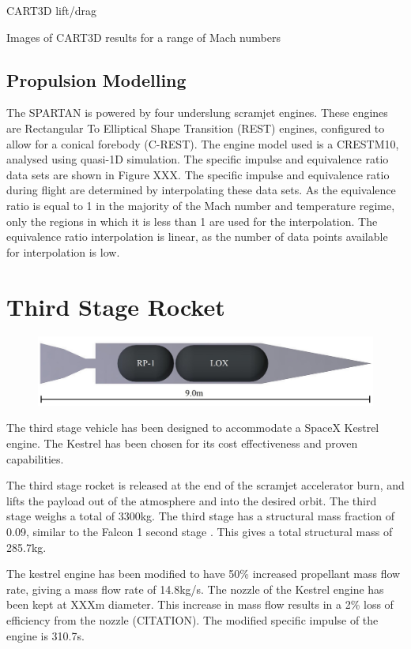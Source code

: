 CART3D lift/drag 

Images of CART3D results for a range of Mach numbers

		
		\subsection{Propulsion Modelling}
		
		The SPARTAN is powered by four underslung scramjet engines. These engines are Rectangular To Elliptical Shape Transition (REST) engines, configured to allow for a conical forebody (C-REST). The engine model used is a CRESTM10, analysed using quasi-1D simulation. The specific impulse and equivalence ratio data sets are shown in Figure XXX. The specific impulse and equivalence ratio during flight are determined by interpolating these data sets. 
		As the equivalence ratio is equal to 1 in the majority of the Mach number and temperature regime, only the regions in which it is less than 1 are used for the interpolation. The equivalence ratio interpolation is linear, as the number of data points available for interpolation is low. 
	
	
	\section{Third Stage Rocket}
	
	\begin{figure}
\centering
\includegraphics[width=0.7\linewidth]{figures/3_vehicle_design/3rdStage}
\caption{}
\label{fig:3rdStage}
\end{figure}

	The third stage vehicle has been designed to accommodate a SpaceX Kestrel engine. The Kestrel has been chosen for its cost effectiveness and proven capabilities. 
	
	The third stage rocket is released at the end of the scramjet accelerator burn, and lifts the payload out of the atmosphere and into the desired orbit. The third stage weighs a total of 3300kg. The third stage has a structural mass fraction of 0.09, similar to the Falcon 1 second stage \cite{Vehicle2008}. This gives a total structural mass of 285.7kg. 
	
	

	
The kestrel engine has been modified to have 50\% increased propellant mass flow rate, giving a mass flow rate of 14.8kg/s. The nozzle of the Kestrel engine has been kept at XXXm diameter. This increase in mass flow results in a 2\% loss of efficiency from the nozzle (CITATION). The modified specific impulse of the engine is 310.7s.

